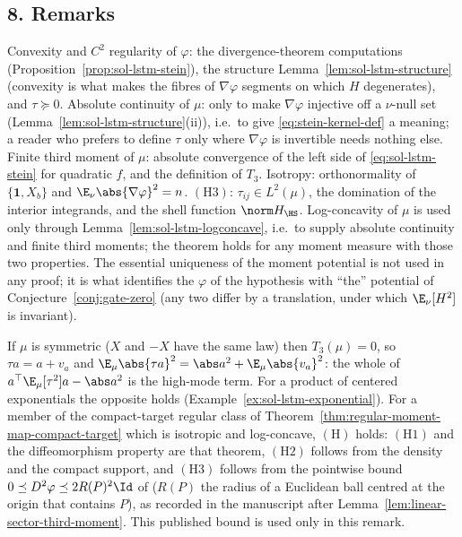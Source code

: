 \documentclass[../main.tex]{subfiles}
\begin{document}
\subsection*{8. Remarks}

\begin{remark}
\label{rem:sol-lstm-hypotheses}
Convexity and $C^2$ regularity of $\varphi$: the divergence-theorem computations
(Proposition~\ref{prop:sol-lstm-stein}), the structure Lemma~\ref{lem:sol-lstm-structure}
(convexity is what makes the fibres of $\nabla\varphi$ segments on which $H$ degenerates), and
$\tau\succeq0$.  Absolute continuity of $\mu$: only to make $\nabla\varphi$ injective off a
$\nu$-null set (Lemma~\ref{lem:sol-lstm-structure}(ii)), i.e.\ to give
\eqref{eq:stein-kernel-def} a meaning; a reader who prefers to define $\tau$ only where
$\nabla\varphi$ is invertible needs nothing else.  Finite third moment of $\mu$: absolute
convergence of the left side of \eqref{eq:sol-lstm-stein} for quadratic $f$, and the
definition of $T_3$.  Isotropy: orthonormality of $\{\mathbf 1,X_b\}$ and
$\E_\nu\abs{\nabla\varphi}^2=n$.  $(\mathrm H3)$: $\tau_{ij}\in L^2(\mu)$, the domination of
the interior integrands, and the shell function $\norm H_{\HS}$.  Log-concavity of $\mu$ is
used only through Lemma~\ref{lem:sol-lstm-logconcave}, i.e.\ to supply absolute continuity
and finite third moments; the theorem holds for any moment measure with those two
properties.  The essential uniqueness of the moment potential
\cite{CorderoErausquinKlartag2015MomentMeasures} is not used in any proof; it is what
identifies the $\varphi$ of the hypothesis with ``the'' potential of
Conjecture~\ref{conj:gate-zero} (any two differ by a translation, under which $\E_\nu[H^2]$
is invariant).
\end{remark}

\begin{remark}
\label{rem:sol-lstm-specialisations}
If $\mu$ is symmetric ($X$ and $-X$ have the same law) then $T_3(\mu)=0$, so
$\tau a=a+v_a$ and $\E_\mu\abs{\tau a}^2=\abs a^2+\E_\mu\abs{v_a}^2$: the whole of
$a^\top\E_\mu[\tau^2]a-\abs a^2$ is the high-mode term.  For a product of centered
exponentials the opposite holds (Example~\ref{ex:sol-lstm-exponential}).  For a member of the
compact-target regular class of Theorem~\ref{thm:regular-moment-map-compact-target} which is
isotropic and log-concave, $(\mathrm H)$ holds: $(\mathrm H1)$ and the diffeomorphism property
are that theorem, $(\mathrm H2)$ follows from the density and the compact support, and
$(\mathrm H3)$ follows from the pointwise bound $0\preceq D^2\varphi\preceq2R(P)^2\Id$ of
\cite[Thm.~1.1]{Klartag2013MomentMeasures} ($R(P)$ the radius of a Euclidean ball centred at the origin that contains $P$), as recorded in
the manuscript after Lemma~\ref{lem:linear-sector-third-moment}.  This published bound is
used only in this remark.
\end{remark}
\end{document}
